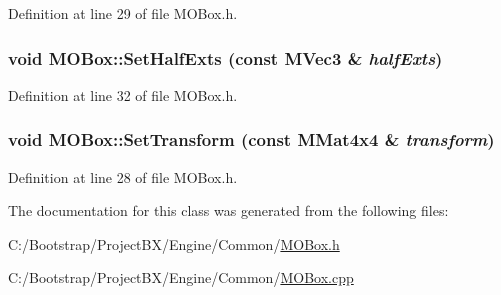 Definition at line 29 of file MOBox.h.\hypertarget{class_m_o_box_d0f5c304ee93de82dedace046647df4d}{
\subsubsection[{SetHalfExts}]{\setlength{\rightskip}{0pt plus 5cm}void MOBox::SetHalfExts (const {\bf MVec3} \& {\em halfExts})}}
\label{class_m_o_box_d0f5c304ee93de82dedace046647df4d}




Definition at line 32 of file MOBox.h.\hypertarget{class_m_o_box_95a1b5fadc347c528687342a48b66bb4}{
\subsubsection[{SetTransform}]{\setlength{\rightskip}{0pt plus 5cm}void MOBox::SetTransform (const {\bf MMat4x4} \& {\em transform})}}
\label{class_m_o_box_95a1b5fadc347c528687342a48b66bb4}




Definition at line 28 of file MOBox.h.

The documentation for this class was generated from the following files:\begin{CompactItemize}
\item 
C:/Bootstrap/ProjectBX/Engine/Common/\hyperlink{_m_o_box_8h}{MOBox.h}\item 
C:/Bootstrap/ProjectBX/Engine/Common/\hyperlink{_m_o_box_8cpp}{MOBox.cpp}\end{CompactItemize}
